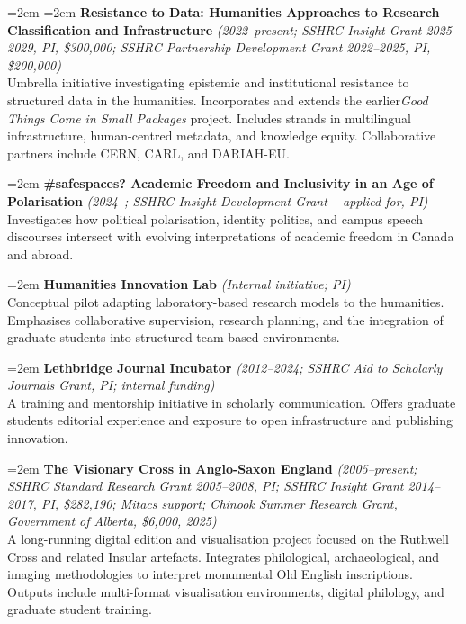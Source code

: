 \documentclass[12pt]{article}
\begin{document}
{\leftskip=2em
\hangindent=2em
\noindent
\textbf{Resistance to Data: Humanities Approaches to Research Classification and Infrastructure} \textit{(2022–present; SSHRC Insight Grant 2025–2029, PI, \$300,000; SSHRC Partnership Development Grant 2022–2025, PI, \$200,000)}\\
Umbrella initiative investigating epistemic and institutional resistance to structured data in the humanities. Incorporates and extends the earlier\textit{Good Things Come in Small Packages} project. Includes strands in multilingual infrastructure, human-centred metadata, and knowledge equity. Collaborative partners include CERN, CARL, and DARIAH-EU.

\hangindent=2em
\noindent
\textbf{\#safespaces? Academic Freedom and Inclusivity in an Age of Polarisation} \textit{(2024–; SSHRC Insight Development Grant – applied for, PI)}\\
Investigates how political polarisation, identity politics, and campus speech discourses intersect with evolving interpretations of academic freedom in Canada and abroad.

\hangindent=2em
\noindent
\textbf{Humanities Innovation Lab} \textit{(Internal initiative; PI)}\\
Conceptual pilot adapting laboratory-based research models to the humanities. Emphasises collaborative supervision, research planning, and the integration of graduate students into structured team-based environments.

\hangindent=2em
\noindent
\textbf{Lethbridge Journal Incubator} \textit{(2012–2024; SSHRC Aid to Scholarly Journals Grant, PI; internal funding)}\\
A training and mentorship initiative in scholarly communication. Offers graduate students editorial experience and exposure to open infrastructure and publishing innovation.

\hangindent=2em
\noindent
\textbf{The Visionary Cross in Anglo-Saxon England} \textit{(2005–present; SSHRC Standard Research Grant 2005–2008, PI; SSHRC Insight Grant 2014–2017, PI, \$282,190; Mitacs support; Chinook Summer Research Grant, Government of Alberta, \$6,000, 2025)}\\
A long-running digital edition and visualisation project focused on the Ruthwell Cross and related Insular artefacts. Integrates philological, archaeological, and imaging methodologies to interpret monumental Old English inscriptions. Outputs include multi-format visualisation environments, digital philology, and graduate student training.

}
\end{document}
